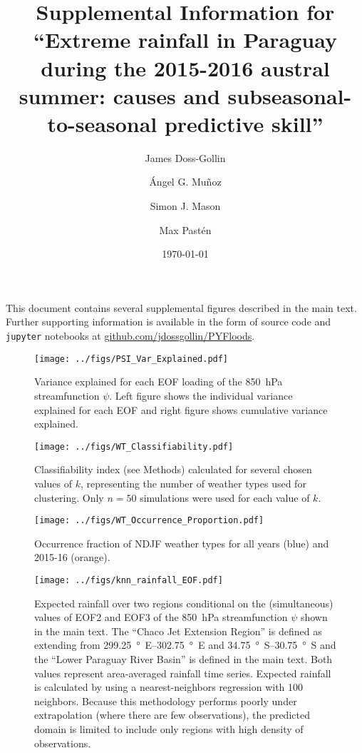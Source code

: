 \documentclass{article}
\title{Supplemental Information for\\``Extreme rainfall in Paraguay during the 2015-2016 austral summer: causes and subseasonal-to-seasonal predictive skill''}
\author{James Doss-Gollin\and \'{A}ngel G. Mu\~{n}oz \and Simon J. Mason \and Max Past\'{e}n}
\date{\today}
\begin{document}
\maketitle

This document contains several supplemental figures described in the main text.
Further supporting information is available in the form of source code and \texttt{jupyter} notebooks at \url{github.com/jdossgollin/PYFloods}.
\listoffigures
\clearpage

\begin{figure}
  \texttt{[image: ../figs/PSI\_Var\_Explained.pdf]}
	\caption{
		Variance explained for each EOF loading of the \SI{850}{\hecto\pascal} streamfunction $\psi$.
    Left figure shows the individual variance explained for each EOF and right figure shows cumulative variance explained.
	}
\end{figure}

\begin{figure}
  \texttt{[image: ../figs/WT\_Classifiability.pdf]}
	\caption{
		Classifiability index (see Methods) calculated for several chosen values of $k$, representing the number of weather types used for clustering.
		Only $n=50$ simulations were used for each value of $k$.
	}
\end{figure}

\begin{figure}
  \texttt{[image: ../figs/WT\_Occurrence\_Proportion.pdf]}
	\caption{
		Occurrence fraction of NDJF weather types for all years (blue) and 2015-16 (orange).
	}
\end{figure}

\begin{figure}
  \texttt{[image: ../figs/knn\_rainfall\_EOF.pdf]}
	\caption{
    Expected rainfall over two regions conditional on the (simultaneous) values of EOF2 and EOF3 of the \SI{850}{\hecto\pascal} streamfunction $\psi$ shown in the main text.
    The ``Chaco Jet Extension Region'' is defined as extending from \SIrange{299.25}{302.75}{\degree E} and \SIrange{34.75}{30.75}{\degree S} and the ``Lower Paraguay River Basin'' is defined in the main text.
    Both values represent area-averaged rainfall time series.
    Expected rainfall is calculated by using a nearest-neighbors regression with 100 neighbors.
    Because this methodology performs poorly under extrapolation (where there are few observations), the predicted domain is limited to include only regions with high density of observations.
    }
\end{figure}
\end{document}
